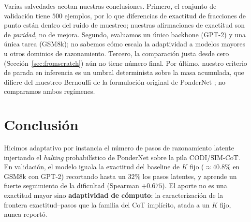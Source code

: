 \documentclass[11pt]{article}
\begin{document}
Varias salvedades acotan nuestras conclusiones. Primero, el conjunto de validación tiene $500$ ejemplos, por lo que diferencias de exactitud de fracciones de punto están dentro del ruido de muestreo; nuestras afirmaciones de exactitud son de \emph{paridad}, no de mejora. Segundo, evaluamos un único backbone (GPT-2) y una única tarea (GSM8k); no sabemos cómo escala la adaptividad a modelos mayores u otros dominios de razonamiento. Tercero, la comparación justa desde cero (Sección~\ref{sec:fromscratch}) aún no tiene número final. Por último, nuestro criterio de parada en inferencia es un umbral determinista sobre la masa acumulada, que difiere del muestreo Bernoulli de la formulación original de PonderNet \citep{banino2021pondernet}; no comparamos ambos regímenes.

\section{Conclusión}

Hicimos adaptativo por instancia el número de pasos de razonamiento latente injertando el \textit{halting} probabilístico de PonderNet sobre la pila CODI/SIM-CoT. En validación, el modelo iguala la exactitud del baseline de $K$ fijo ($\approx 40.8\%$ en GSM8k con GPT-2) recortando hasta un $32\%$ los pasos latentes, y aprende un fuerte seguimiento de la dificultad (Spearman $+0.675$). El aporte no es una exactitud mayor sino \textbf{adaptividad de cómputo}: la caracterización de la frontera exactitud--pasos que la familia del CoT implícito, atada a un $K$ fijo, nunca reportó.


\end{document}
